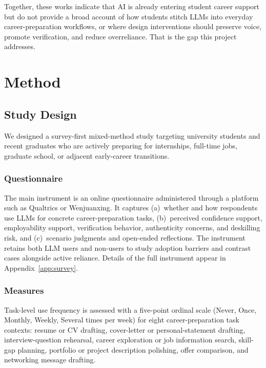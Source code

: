 \documentclass[sigconf,review,anonymous]{acmart}
\begin{document}
Together, these works indicate that AI is already entering student career
support but do not provide a broad account of how students stitch LLMs into
everyday career-preparation workflows, or where design interventions should
preserve voice, promote verification, and reduce overreliance.  That is the
gap this project addresses.

\section{Method}

\subsection{Study Design}

We designed a survey-first mixed-method study targeting university students
and recent graduates who are actively preparing for internships, full-time
jobs, graduate school, or adjacent early-career transitions.

\subsubsection{Questionnaire}
The main instrument is an online questionnaire administered through a
platform such as Qualtrics or Wenjuanxing.  It captures (a)~whether and how
respondents use LLMs for concrete career-preparation tasks, (b)~perceived
confidence support, employability support, verification behavior,
authenticity concerns, and deskilling risk, and (c)~scenario judgments and
open-ended reflections.  The instrument retains both LLM users and non-users
to study adoption barriers and contrast cases alongside active reliance.
Details of the full instrument appear in Appendix~\ref{app:survey}.

\subsubsection{Measures}
Task-level use frequency is assessed with a five-point ordinal scale (Never,
Once, Monthly, Weekly, Several times per week) for eight career-preparation
task contexts: resume or CV drafting, cover-letter or personal-statement
drafting, interview-question rehearsal, career exploration or job
information search, skill-gap planning, portfolio or project description
polishing, offer comparison, and networking message drafting.
\end{document}
